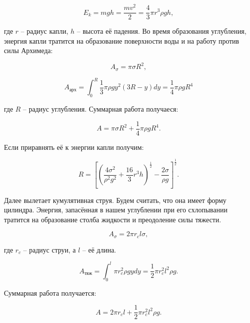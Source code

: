 \documentclass[a4paper, 12pt]{article}
\begin{document}
\begin{equation}
    E_k = mgh = \frac{mv^2}{2} = \frac{4}{3}\pi{r^3}{\rho}gh,
\end{equation}

где $r$ -- радиус капли, $h$ -- высота её падения.
Во время образования углубления, энергия капли тратится на образование
поверхности воды и на работу против силы Архимеда:

\begin{equation}
    A_\sigma = \pi{\sigma}R^2,
\end{equation}

\begin{equation}
    A_\text{арх} = \int_{0}^{R} \frac{1}{3}{\pi}{\rho}gy^2(3R-y)dy = 
    \frac{1}{4}\pi{\rho}gR^4
\end{equation}

где $R$ -- радиус углубления.
Суммарная работа получаеся:

\begin{equation}
    A = \pi\sigma{R^2} + \frac{1}{4}\pi{\rho}gR^4.
\end{equation}

Если приравнять её к энергии капли получим:

\begin{equation}
    R = \left [\left (\frac{4\sigma^2}{\rho^2g^2} +
               \frac{16}{3}r^3h \right )^\frac{1}{2}
               - \frac{2\sigma}{\rho{g}} \right ] ^ \frac{1}{2}.
\end{equation}


Далее вылетает кумулятивная струя. Будем считать, что она имеет форму
цилиндра. Энергия, запасённая в нашем углублении при его схлопывании
тратится на образование столба жидкости и преодоление силы тяжести.

\begin{equation}
    A_\sigma = 2\pi{r_c}l\sigma,
\end{equation}

где $r_c$ -- радиус струи, а $l$ -- её длина.

\begin{equation}
    A_\text{тяж} = \int_{0}^{l} \pi{r_c^2}\rho{g}ydy =
                   \frac{1}{2}\pi{r_c^2}l^2\rho{g}.
\end{equation}

Суммарная работа получается:

\begin{equation}
    A = 2\pi{r_c}l + \frac{1}{2}\pi{r_c^2}l^2\rho{g}.
\end{equation}
\end{document}

